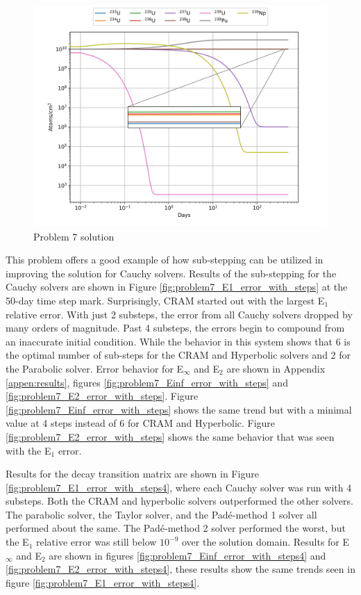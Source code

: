 \begin{figure}[p]
    \centering
    \includegraphics[width=6in]{images/chapter-5/progressionProblems/problem7/problem7soltution.png}
    \caption{Problem 7 solution}
    \label{fig:problem7_solution}
\end{figure}

\clearpage

This problem offers a good example of how sub-stepping can be utilized in improving the solution for Cauchy solvers.  Results of the sub-stepping for the Cauchy solvers are shown in Figure \ref{fig:problem7_E1_error_with_steps} at the 50-day time step mark. Surprisingly, CRAM started out with the largest E${}_{1}$ relative error. With just 2 substeps, the error from all Cauchy solvers dropped by many orders of magnitude. Past 4 substeps, the errors begin to compound from an inaccurate initial condition. While the behavior in this system shows that 6 is the optimal number of sub-steps for the CRAM and Hyperbolic solvers and 2 for the Parabolic solver. Error behavior for E${}_{\infty}$ and E${}_{2}$ are shown in Appendix \ref{appen:results}, figures \ref{fig:problem7_Einf_error_with_steps} and \ref{fig:problem7_E2_error_with_steps}. Figure \ref{fig:problem7_Einf_error_with_steps} shows the same trend but with a minimal value at 4 steps instead of 6 for CRAM and Hyperbolic. Figure \ref{fig:problem7_E2_error_with_steps} shows the same behavior that was seen with the E${}_{1}$ error. 

Results for the decay transition matrix are shown in Figure \ref{fig:problem7_E1_error_with_steps4}, where each Cauchy solver was run with 4 substeps. Both the CRAM and hyperbolic solvers outperformed the other solvers. The parabolic solver, the Taylor solver, and the Pad\'e-method 1 solver all performed about the same. The Pad\'e-method 2 solver performed the worst, but the E${}_{1}$ relative error was still below $10^{-9}$ over the solution domain. Results for E${}_{\infty}$ and E${}_{2}$ are shown in figures \ref{fig:problem7_Einf_error_with_steps4} and \ref{fig:problem7_E2_error_with_steps4}, these results show the same trends seen in figure \ref{fig:problem7_E1_error_with_steps4}. 


